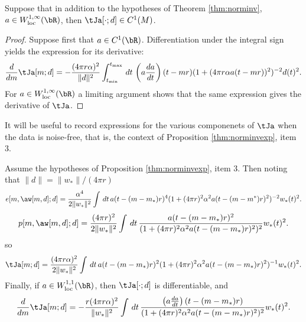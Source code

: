 \begin{theorem}
  \label{thm:diffobj}
  Suppose that in addition to the hypotheses of Theorem
  \ref{thm:norminv}, $a \in W^{1,\infty}_{\rm loc}(\bR)$, then $\tJa[\cdot;d]
  \in C^1(M)$.
\end{theorem}

\begin{proof}
Suppose first that $a \in C^1(\bR)$. Differentiation under the integral sign  
  yields the expression for its derivative:
\begin{equation}
  \label{eqn:dexpjgen}
  \frac{d}{dm}\tJa[m;d] = -\frac{(4 \pi r \alpha)^2}{\|d\|^2} \int_{t_{\rm min}}^{t_{\rm max}} \,dt \, 
  \left(a\frac{da}{dt}\right)(t-mr)(1+(4\pi r \alpha 
  a(t-mr))^2)^{-2}d(t)^2. 
\end{equation}
For $a \in W^{1,\infty}_{\rm loc}(\bR)$ a limiting argument shows that the
same expression gives the derivative of $\tJa$.
\end{proof}

It will be useful to record expressions for the various componenets of
$\tJa$ when the data is noise-free, that is, the context of
Proposition \ref{thm:norminvexp}, item 3.

\begin{corollary}
  \label{thm:epjnonoise}
  Assume the hypotheses of Proposition \ref{thm:norminvexp}, item
  3. Then noting that $\|d\| = \|w_*\|/(4 \pi r)$
\begin{equation}
  \label{eqn:residnorm}
  e[m,\aw[m,d];d] 
= \frac{\alpha^4}{2\|w_*\|^2}\int\,dt\,a(t-(m-m_*)r)^4(1+(4\pi r)^2 \alpha^2 
    a(t-(m-m^*)r)^2)^{-2}w_*(t)^2.
\end{equation}
\begin{equation}
  \label{eqn:anninorm}
  p[m,\aw[m,d];d] = \frac{(4\pi r)^2}{2\|w_*\|^2}\int \,dt\,  
  \frac{a(t-(m-m_*)r)^2}{(1+ (4\pi r)^2\alpha^2
    a(t-(m-m_*)r)^2)^{2}}w_*(t)^2.
\end{equation}
so 
\begin{equation}
\label{eqn:expjnonoise}
\tJa[m;d] = \frac{(4\pi r \alpha)^2}{2\|w_*\|^2}\int\,dt\,a(t-(m-m_*)r)^2(1+(4\pi r)^2 \alpha^2 
  a(t-(m-m_*)r)^2)^{-1}w_*(t)^2. 
\end{equation}
Finally, if $a \in W^{1,1}_{\rm loc}(\bR)$, then $\tJa[\cdot;d]$ is differentiable, and 
\begin{equation}
  \label{eqn:dexpjnonoise}
  \frac{d}{dm}\tJa[m;d] = -\frac{r (4\pi r \alpha)^2}{\|w_*\|^2} \int \,dt \, 
  \frac{\left(a\frac{da}{dt}\right)(t-(m-m_*)r)}{(1+(4\pi r)^2 \alpha^2 
  a(t-(m-m_*)r)^2)^{2}}w_*(t)^2. 
\end{equation}
\end{corollary}

